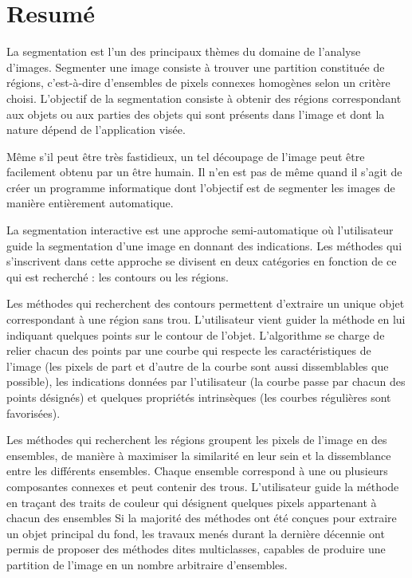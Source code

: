 \chapter*{Resumé}

La segmentation est l'un des principaux thèmes du domaine de l'analyse d'images. Segmenter une image consiste à trouver une partition constituée de régions, c'est-à-dire d'ensembles de pixels connexes homogènes selon un critère choisi. L'objectif de la segmentation consiste à obtenir des régions correspondant aux objets ou aux parties des objets qui sont présents dans l'image et dont la nature dépend de l'application visée.

Même s'il peut être très fastidieux, un tel découpage de l'image peut être facilement obtenu par un être humain. Il n'en est pas de même quand il s'agit de créer un programme informatique dont l'objectif est de segmenter les images de manière entièrement automatique.

La segmentation interactive est une approche semi-automatique où l'utilisateur guide la segmentation d'une image en donnant des indications. Les méthodes qui s'inscrivent dans cette approche se divisent en deux catégories en fonction de ce qui est recherché : les contours ou les régions.

Les méthodes qui recherchent des contours permettent d'extraire un unique objet correspondant à une région sans trou. L'utilisateur vient guider la méthode en lui indiquant quelques points sur le contour de l'objet.  L'algorithme se charge de relier chacun des points par une courbe qui respecte les caractéristiques de l'image (les pixels de part et d'autre de la courbe sont aussi dissemblables que possible), les indications données par l'utilisateur (la courbe passe par chacun des points désignés) et quelques propriétés intrinsèques (les courbes régulières sont favorisées). 

Les méthodes qui recherchent les régions groupent les pixels de l'image en des ensembles, de manière à maximiser la similarité en leur sein et la dissemblance entre les différents ensembles. Chaque ensemble correspond à une ou plusieurs composantes connexes et peut contenir des trous. L'utilisateur guide la méthode en traçant des traits de couleur qui désignent quelques pixels appartenant à chacun des ensembles
Si la majorité des méthodes ont été conçues pour extraire un objet principal du fond, les travaux menés durant la dernière décennie ont permis de proposer des méthodes dites multiclasses, capables de produire une partition de l'image en un nombre arbitraire d'ensembles. 

